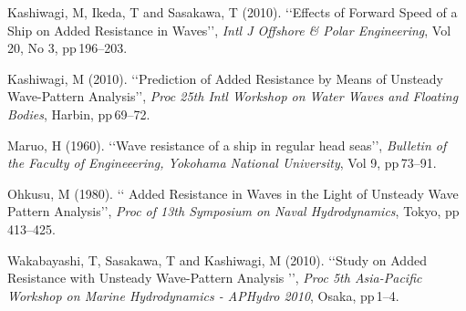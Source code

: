 \documentclass[11pt,fleqn,a3]{article}
\begin{document}
\vspace*{1.5mm}

\hspace*{4mm}\begin{minipage}[t]{87.0mm}
\noindent\hspace*{-5.0mm}
Kashiwagi, M, Ikeda, T and Sasakawa, T (2010). 
\lq\lq Effects of Forward Speed of a Ship on Added Resistance in Waves\rq\rq, 
{\it Intl J Offshore \& Polar Engineering}, Vol\,\,20, No\,\,3, pp\,196\hs--203.
\end{minipage}\hfill

\vspace*{1.5mm}

\hspace*{4mm}\begin{minipage}[t]{87.0mm}
\noindent\hspace*{-5.0mm}
Kashiwagi, M (2010). 
\lq\lq Prediction of Added Resistance by Means of Unsteady Wave-Pattern Analysis\rq\rq, 
{\it Proc 25th Intl Workshop on Water Waves and Floating Bodies}, Harbin, 
pp\,69\hs--72.
\end{minipage}\hfill

\vspace*{1.5mm}

\hspace*{4mm}\begin{minipage}[t]{87.0mm}
\noindent\hspace*{-4.8mm}
Maruo, H (1960). \lq\lq Wave resistance of a ship in regular head seas\rq\rq, 
{\it Bulletin of the Faculty of Engineeering, Yokohama National University}, 
Vol\,\,9, pp\,73\hs--91.
\end{minipage}\hfill

\vspace*{1.5mm}

\hspace*{4mm}\begin{minipage}[t]{87.0mm}
\noindent\hspace*{-4.8mm}
Ohkusu, M (1980).  \lq\lq
Added Resistance in Waves in the Light of Unsteady Wave 
Pattern Analysis\rq\rq, {\it Proc of 13th Symposium on Naval Hydrodynamics}, Tokyo, 
pp\,413--425.
\end{minipage}\hfill

\vspace*{1.5mm}

\hspace*{4mm}\begin{minipage}[t]{87.0mm}
\noindent\hspace*{-4.75mm}
Wakabayashi, T, Sasakawa, T and Kashiwagi, M (2010). 
\lq\lq Study on Added Resistance with Unsteady Wave-Pattern Analysis \rq\rq, 
{\it Proc 5th Asia-Pacific Workshop on Marine Hydrodynamics - APHydro 2010}, Osaka, 
pp\,1\hs--4.
\end{minipage}\hfill
 
%
\end{document}
